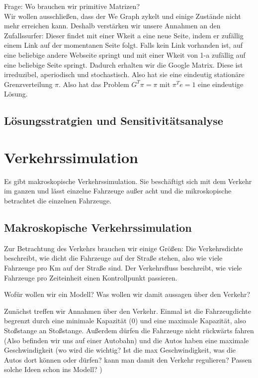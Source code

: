 \documentclass[]{article}
\begin{document}
Frage: Wo brauchen wir primitive Matrizen? \\
  
Wir wollen ausschließen, dass der We Graph zykelt und einige Zustände nicht mehr erreichen kann. Deshalb verstärken wir unsere Annahmen an den Zufallssurfer: Dieser findet mit einer Wkeit a eine neue Seite, indem er zufällig einem Link auf der momentanen Seite folgt. Falls kein Link vorhanden ist, auf eine beliebige andere Webseite springt und mit einer Wkeit von 1-a zufällig auf eine beliebige Seite springt. Dadurch erhalten wir die Google Matrix. Diese ist irreduzibel, aperiodisch und stochastisch. Also hat sie eine eindeutig stationäre Grenzverteilung $\pi$. Also hat das Problem $G^T \pi = \pi$ mit $\pi^Te = 1$ eine eindeutige Lösung.    
 
 \subsection{Lösungsstratgien und Sensitivitätsanalyse}   
 




\section{Verkehrssimulation}
Es gibt makroskopische Verkehrssimulation. Sie beschäftigt sich mit dem Verkehr im ganzen und lässt einzelne Fahrzeuge außer acht und die mikroskopische betrachtet die einzelnen Fahrzeuge. 

\subsection{Makroskopische Verkehrssimulation}
Zur Betrachtung des Verkehrs brauchen wir einige Größen: Die Verkehrsdichte beschreibt, wie dicht die Fahrzeuge auf der Straße stehen, also wie viele Fahrzeuge pro Km auf der Straße sind. Der Verkehrsfluss beschreibt, wie viele Fahrzeuge pro Zeiteinheit einen Kontrollpunkt passieren. 

Wofür wollen wir ein Modell?  Was wollen wir damit aussagen über den Verkehr? 

Zunächst treffen wir Annahmen über den Verkehr. Einmal ist die Fahrzeugdichte begrenzt durch eine minimale Kapazität (0) und eine maximale Kapazität, also Stoßstange an Stoßstange. Außerdem dürfen die Fahrzeuge nicht rückwärts fahren (Also befinden wir uns auf einer Autobahn) und die Autos haben eine maximale Geschwindigkeit (wo wird die wichtig? Ist die max Geschwindigkeit, was die Autos dort können oder dürfen? kann man damit den Verkehr regulieren? Passen solche Ideen schon ins Modell? )
\end{document}
